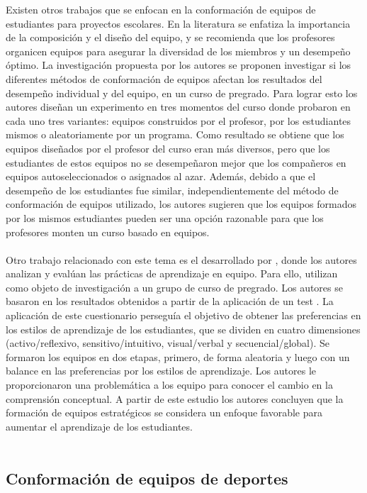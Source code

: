 Existen otros trabajos que se enfocan en la conformación de equipos de estudiantes para proyectos escolares. En la literatura se enfatiza la importancia de la composición y el diseño del equipo, y se recomienda que los profesores organicen equipos para asegurar la diversidad de los miembros y un desempeño óptimo. La investigación propuesta por \cite{Pociask2017} los autores se proponen investigar si los diferentes métodos de conformación de equipos afectan los resultados del desempeño individual y del equipo, en un curso de pregrado. Para lograr esto los autores diseñan un experimento en tres momentos del curso donde probaron en cada uno tres variantes: equipos construidos por el profesor, por los estudiantes mismos o aleatoriamente por un programa. Como resultado se obtiene que los equipos diseñados por el profesor del curso eran más diversos, pero que los estudiantes de estos equipos no se desempeñaron mejor que los compañeros en equipos autoseleccionados o asignados al azar. Además, debido a que el desempeño de los estudiantes fue similar, independientemente del método de conformación de equipos utilizado, los autores sugieren que los equipos formados por los mismos estudiantes pueden ser una opción razonable para que los profesores monten un curso basado en equipos. \\\\


Otro trabajo relacionado con este tema es el desarrollado por \cite{Kittur2020}, donde los autores analizan y evalúan las prácticas de aprendizaje en equipo. Para ello, utilizan como objeto de investigación a un grupo de curso de pregrado. Los autores se basaron en los resultados obtenidos a partir de la aplicación de un test \cite{Felder}. La aplicación de este cuestionario perseguía el objetivo de obtener las preferencias en los estilos de aprendizaje de los estudiantes, que se dividen en cuatro dimensiones (activo/reflexivo, sensitivo/intuitivo, visual/verbal y secuencial/global). Se formaron los equipos en dos etapas, primero, de forma aleatoria y luego con un balance en las preferencias por los estilos de aprendizaje. Los autores le proporcionaron una problemática a los equipo para conocer el cambio en la comprensión conceptual. A partir de este estudio los autores concluyen que la formación de equipos estratégicos se considera un enfoque favorable para aumentar el aprendizaje de los estudiantes. \\\\


\subsection{Conformación de equipos de deportes}

